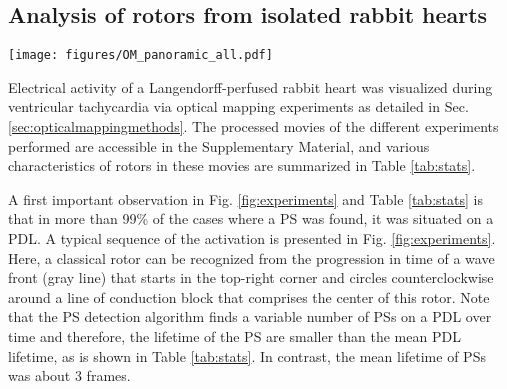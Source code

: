 \documentclass{article}
\newcommand{\phiact}{\ensuremath{\phi_{\rm act}}}
\newcommand{\phiarr}{\ensuremath{\phi_{\rm arr}}}
\begin{document}
\subsection{Analysis of rotors from isolated rabbit hearts}
\label{sec:experiment}


\begin{figure*}[t]%
\centering
\texttt{[image: figures/OM\_panoramic\_all.pdf]}
\caption{Analysis of two-sided optical mapping data in rabbit hearts during ventricular tachycardia. Left column: normalized optical intensity (transmembrane voltage) $V$, together with WF ($V=0.5, \dot{V}>0$) and wave back ($V=0.5, \dot{V} < 0$). Middle column: same data series, $\phiact$ computed with $R$ the Hilbert transform of $V$, with PSs and PDLs computed from $\phiact$. Right column: colormap indicates $\phiarr$, computed with $\tau = 99$\,ms, equal to the inverse dominant frequency. PSs and PDLs computed from $\phiarr$ are also shown. PS detection was done using the $2\times 2 + 4\times 4$ method of \citep{Kuklik:2017}. 
\label{fig:experiments}
}
\end{figure*}

Electrical activity of a Langendorff-perfused rabbit heart was visualized during ventricular tachycardia via optical mapping experiments \citep{Kulkarni:2018} as detailed in Sec. \ref{sec:opticalmappingmethods}.
The processed movies of the different experiments performed are accessible in the Supplementary Material, and various characteristics of rotors in these movies are summarized in Table \ref{tab:stats}.

A first important observation in Fig. \ref{fig:experiments} and Table \ref{tab:stats} is that in more than 99\% of the cases where a PS was found, it was situated on a PDL. A typical sequence of the activation is presented in Fig. \ref{fig:experiments}. Here, a classical rotor can be recognized from the progression in time of a wave front (gray line) that starts in the top-right corner and circles counterclockwise around a line of conduction block that comprises the center of this rotor. Note that the PS detection algorithm finds a variable number of PSs on a PDL over time and therefore, the lifetime of the PS are smaller than the mean PDL lifetime, as is shown in Table \ref{tab:stats}. In contrast, the mean lifetime of PSs was about 3 frames. 
\end{document}
